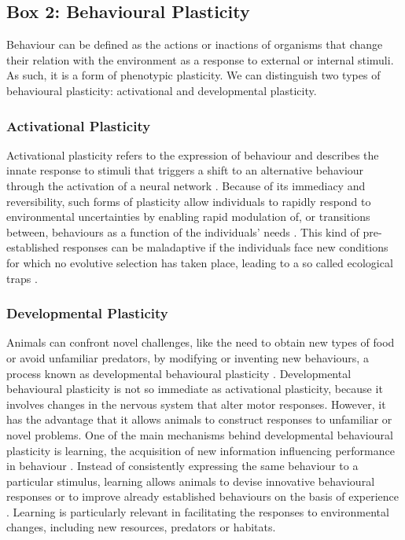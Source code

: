 \begin{small}
\begin{framed}
\subsection*{Box 2: Behavioural Plasticity}

Behaviour can be defined as the actions or inactions of organisms that change
their relation with the environment as a response to external or internal
stimuli. As such, it is a form of phenotypic plasticity. We can distinguish two
types of behavioural plasticity: activational and developmental plasticity.

\subsubsection*{Activational Plasticity}

Activational plasticity refers to the expression of behaviour and describes the
innate response to stimuli that triggers a shift to an alternative behaviour
through the activation of a neural network \citep{Snell-Rood2013}. Because of
its immediacy and reversibility, such forms of plasticity allow individuals to
rapidly respond to environmental uncertainties by enabling rapid modulation
of, or transitions between, behaviours as a function of the individuals’ needs
\citep{Snell-Rood2013,Sol2013a}. This kind of pre-established responses can be
maladaptive if the individuals face new conditions for which no evolutive
selection has taken place, leading to a so called ecological traps
\citep{Kokko2001}.

\subsubsection*{Developmental Plasticity}

Animals can confront novel challenges, like the need to obtain new types of food
or avoid unfamiliar predators, by modifying or inventing new behaviours, a
process known as developmental behavioural plasticity \citep{Snell-Rood2013}.
Developmental behavioural plasticity is not so immediate as activational
plasticity, because it involves changes in the nervous system that alter motor
responses. However, it has the advantage that it allows animals to construct
responses to unfamiliar or novel problems. One of the main mechanisms behind
developmental behavioural plasticity is learning, the acquisition of new
information influencing performance in behaviour \citep{Dukas1998}. Instead of
consistently expressing the same behaviour to a particular stimulus, learning
allows animals to devise innovative behavioural responses or to improve already
established behaviours on the basis of experience
\citep{Lefebvre1997,Dukas1998,Reader2002,VanSchaik2003,Ricklefs2004}. Learning
is particularly relevant in facilitating the responses to environmental changes,
including new resources, predators or habitats.
\end{framed}
\end{small}


